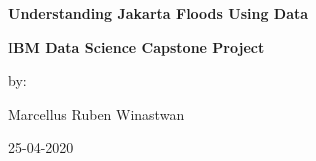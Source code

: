 \thispagestyle{empty}
\begin{titlepage}
    
    \vspace*{\fill}

	\begin{center}
    \vspace*{0.5cm}

    \huge
    \textbf{Understanding Jakarta Floods Using Data}
    \vspace*{0.5cm}
    
    \large I\textbf{BM Data Science Capstone Project}
    \vspace*{1.5cm}
    
	\small by:
	
	\vspace*{0.15cm}
    \large Marcellus Ruben Winastwan
    
    \vspace*{0.5cm}
    \large 25-04-2020
    
	\end{center}
    \vspace*{\fill}
    \end{titlepage}